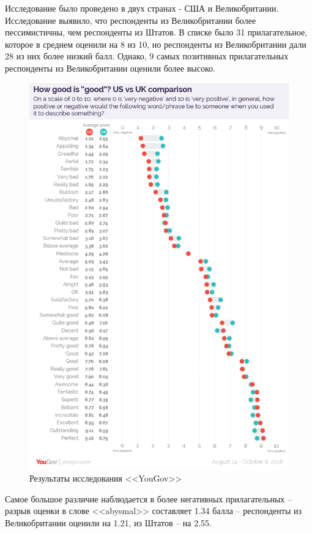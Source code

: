 Исследование было проведено в двух странах - США и Великобритании. Исследование выявило, что респонденты из Великобритании более пессимистичны, чем респонденты из Штатов. В списке было 31 прилагательное, которое в среднем оценили на 8 из 10, но респонденты из Великобритании дали 28 из них более низкий балл. Однако, 9 самых позитивных прилагательных респонденты из Великобритании оценили более высоко. \\
\begin{center}
	\begin{figure}[H]
		\centering
		\includegraphics[width=0.85\linewidth]{assets/goodisgood-all.png}
		\caption{Результаты исследования <<YouGov>>\cite{goodisgood}}
		\label{fig:gig-all}
	\end{figure}
\end{center}
 
Самое большое различие наблюдается в более негативных прилагательных -- разрыв оценки в слове <<abysmal>> составляет 1.34 балла -- респонденты из Великобритании оценили на  1.21, из Штатов -- на 2.55. 

